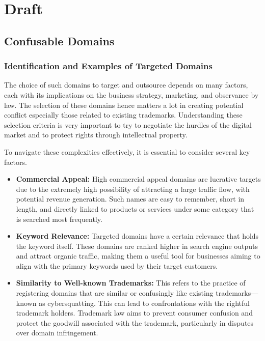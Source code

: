 \chapter{Draft}

\section{Confusable Domains}
\subsection{Identification and Examples of Targeted Domains}

The choice of such domains to target and outsource depends on many factors, each with its implications on the business strategy, marketing, and observance by law. The selection of these domains hence matters a lot in creating potential conflict especially those related to existing trademarks. Understanding these selection criteria is very important to try to negotiate the hurdles of the digital market and to protect rights through intellectual property. 

To navigate these complexities effectively, it is essential to consider several key factors. 

\begin{itemize}
  \item \textbf{Commercial Appeal:} High commercial appeal domains are lucrative targets due to the extremely high possibility of attracting a large traffic flow, with potential revenue generation. Such names are easy to remember, short in length, and directly linked to products or services under some category that is searched most frequently.\cite{Li2002ConflictDomainTrademark}
  
  \item \textbf{Keyword Relevance:} Targeted domains have a certain relevance that holds the keyword itself. These domains are ranked higher in search engine outputs and attract organic traffic, making them a useful tool for businesses aiming to align with the primary keywords used by their target customers.
  
  \item \textbf{Similarity to Well-known Trademarks:} This refers to the practice of registering domains that are similar or confusingly like existing trademarks—known as cybersquatting. This can lead to confrontations with the rightful trademark holders. Trademark law aims to prevent consumer confusion and protect the goodwill associated with the trademark, particularly in disputes over domain infringement.
\end{itemize}

